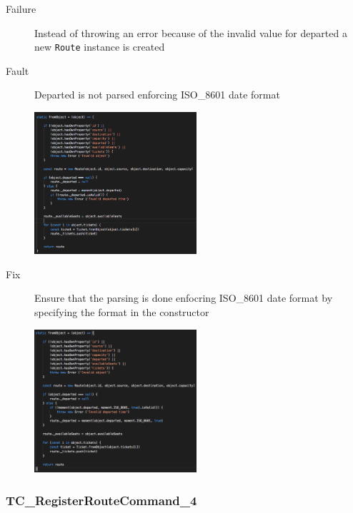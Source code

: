 \documentclass[11pt]{article}
\begin{document}
\begin{description}
\item[{Failure}] Instead of throwing an error because of the invalid value for departed a new \texttt{Route} instance is created
\item[{Fault}] Departed is not parsed enforcing ISO\_8601 date format
\begin{center}
\includegraphics[width=6cm]{./Iteration2.rtfd/Pasted Graphic 8.tiff.png}
\end{center}
\item[{Fix}] Ensure that the parsing is done enfocring ISO\_8601 date format by specifying the format in the constructor
\begin{center}
\includegraphics[width=6cm]{./Iteration2.rtfd/Pasted Graphic 7.tiff.png}
\end{center}
\end{description}

\subsubsection{TC\_RegisterRouteCommand\_4}
\label{sec:orge7f3159}
\end{document}
